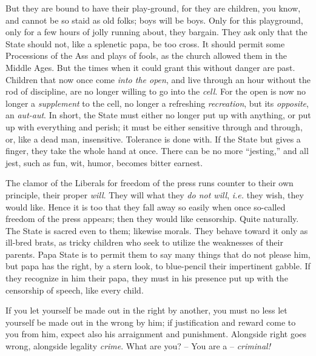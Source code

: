 But they are bound to have their play-ground, for they are children, you know, 
and cannot be so staid as old folks; boys will be boys. Only for this 
playground, only for a few hours of jolly running about, they bargain. They 
ask only that the State should not, like a splenetic papa, be too cross. It 
should permit some Processions of the Ass and plays of fools, as the church 
allowed them in the Middle Ages. But the times when it could grant this 
without danger are past. Children that now once come \textit{into the open}, 
and live through an hour without the rod of discipline, are no longer willing 
to go into the \textit{cell}. For the open is now no longer a 
\textit{supplement} to the cell, no longer a refreshing \textit{recreation}, 
but its \textit{opposite}, an \textit{aut-aut}. In short, the State must 
either no longer put up with anything, or put up with everything and perish; 
it must be either sensitive through and through, or, like a dead man, 
insensitive. Tolerance is done with. If the State but gives a finger, they 
take the whole hand at once. There can be no more ``jesting,'' and all jest, 
such as fun, wit, humor, becomes bitter earnest.

The clamor of the Liberals for freedom of the press runs counter to their own 
principle, their proper \textit{will}. They will what they \textit{do not 
will}, \textit{i.e.} they wish, they would like. Hence it is too that they 
fall away so easily when once so-called freedom of the press appears; then 
they would like censorship. Quite naturally. The State is sacred even to them; 
likewise morals. They behave toward it only as ill-bred brats, as tricky 
children who seek to utilize the weaknesses of their parents. Papa State is to 
permit them to say many things that do not please him, but papa has the right, 
by a stern look, to blue-pencil their impertinent gabble. If they recognize in 
him their papa, they must in his presence put up with the censorship of 
speech, like every child.

\myhrule


If you let yourself be made out in the right by another, you must no less let 
yourself be made out in the wrong by him; if justification and reward come to 
you from him, expect also his arraignment and punishment. Alongside right goes 
wrong, alongside legality \textit{crime}. What are you? -- You are a -- 
\textit{criminal!}

